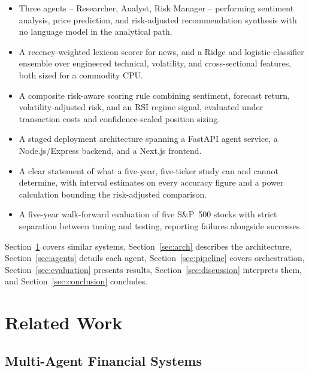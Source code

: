 \documentclass[conference]{IEEEtran}
\begin{document}
\begin{itemize}
\item Three agents -- Researcher, Analyst, Risk Manager -- performing sentiment analysis, price prediction, and risk-adjusted recommendation synthesis with no language model in the analytical path.
\item A recency-weighted lexicon scorer for news, and a Ridge and logistic-classifier ensemble over engineered technical, volatility, and cross-sectional features, both sized for a commodity CPU.
\item A composite risk-aware scoring rule combining sentiment, forecast return, volatility-adjusted risk, and an RSI regime signal, evaluated under transaction costs and confidence-scaled position sizing.
\item A staged deployment architecture spanning a FastAPI agent service, a Node.js/Express backend, and a Next.js frontend.
\item A clear statement of what a five-year, five-ticker study can and cannot determine, with interval estimates on every accuracy figure and a power calculation bounding the risk-adjusted comparison.
\item A five-year walk-forward evaluation of five S\&P~500 stocks with strict separation between tuning and testing, reporting failures alongside successes.
\end{itemize}

Section~\ref{sec:related} covers similar systems, Section~\ref{sec:arch} describes the architecture, Section~\ref{sec:agents} details each agent, Section~\ref{sec:pipeline} covers orchestration, Section~\ref{sec:evaluation} presents results, Section~\ref{sec:discussion} interprets them, and Section~\ref{sec:conclusion} concludes.

\section{Related Work}
\label{sec:related}

\subsection{Multi-Agent Financial Systems}
\end{document}
